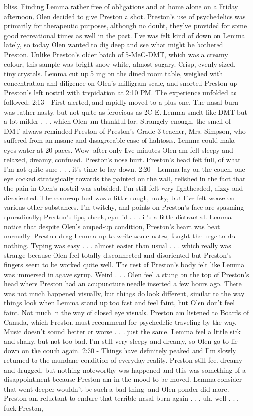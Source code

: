 \documentclass[12pt]{book}
\begin{document}
bliss. Finding Lemma rather free of obligations and at home alone on a Friday afternoon, Olen decided to give Preston a shot. Preston's use of psychedelics was primarily for therapeutic purposes, although no doubt, they've provided for some good recreational times as well in the past. I've was felt kind of down on Lemma lately, so today Olen wanted to dig deep and see what might be bothered Preston. Unlike Preston's older batch of 5-MeO-DMT, which was a creamy colour, this sample was bright snow white, almost sugary. Crisp, evenly sized, tiny crystals. Lemma cut up 5 mg on the dined room table, weighed with concentration and diligence on Olen's milligram scale, and snorted Preston up Preston's left nostril with trepidation at 2:10 PM. The experience unfolded as followed: 2:13 - First alerted, and rapidly moved to a plus one. The nasal burn was rather nasty, but not quite as ferocious as 2C-E. Lemma smelt like DMT but a lot milder  . . .  which Olen am thankful for. Strangely enough, the smell of DMT always reminded Preston of Preston's Grade 3 teacher, Mrs. Simpson, who suffered from an insane and disagreeable case of halitosis. Lemma could make eyes water at 20 paces. Wow, after only five minutes Olen am felt sleepy and relaxed, dreamy, confused. Preston's nose hurt. Preston's head felt full, of what I'm not quite sure  . . .  it's time to lay down. 2:20 - Lemma lay on the couch, one eye cocked strategically towards the painted on the wall, relished in the fact that the pain in Olen's nostril was subsided. I'm still felt very lightheaded, dizzy and disoriented. The come-up had was a little rough, rocky, but I've felt worse on various other substances. I'm twitchy, and points on Preston's face are spasming sporadically; Preston's lips, cheek, eye lid  . . .  it's a little distracted. Lemma notice that despite Olen's amped-up condition, Preston's heart was beat normally. Preston drag Lemma up to write some notes, fought the urge to do nothing. Typing was easy  . . .  almost easier than usual  . . .  which really was strange because Olen feel totally disconnected and disoriented but Preston's fingers seem to be worked quite well. The rest of Preston's body felt like Lemma was immersed in agave syrup. Weird  . . .  Olen feel a stung on the top of Preston's head where Preston had an acupuncture needle inserted a few hours ago. There was not much happened visually, but things do look different, similar to the way things look when Lemma stand up too fast and feel faint, but Olen don't feel faint. Not much in the way of closed eye visuals. Preston am listened to Boards of Canada, which Preston must recommend for psychedelic traveling by the way. Music doesn't sound better or worse  . . .  just the same. Lemma feel a little sick and shaky, but not too bad. I'm still very sleepy and dreamy, so Olen go to lie down on the couch again. 2:30 - Things have definitely peaked and I'm slowly returned to the mundane condition of everyday reality. Preston still feel dreamy and drugged, but nothing noteworthy was happened and this was something of a disappointment because Preston am in the mood to be moved. Lemma consider that went deeper wouldn't be such a bad thing, and Olen ponder did more. Preston am reluctant to endure that terrible nasal burn again  . . .  uh, well  . . .  fuck Preston, 
\end{document}
